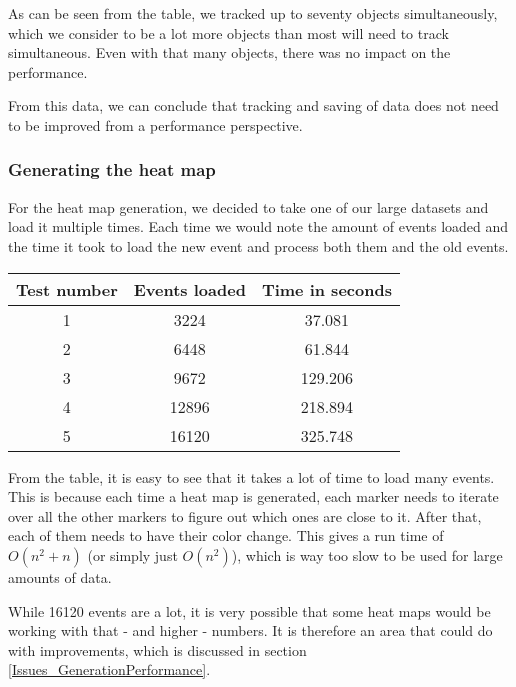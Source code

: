 As can be seen from the table, we tracked up to seventy objects simultaneously, which we consider to be a lot more objects than most will need to track simultaneous. Even with that many objects, there was no impact on the performance.

From this data, we can conclude that tracking and saving of data does not need to be improved from a performance perspective.

\subsubsection{Generating the heat map}
\label{Testing_Performance_Generating}

For the heat map generation, we decided to take one of our large datasets and load it multiple times. Each time we would note the amount of events loaded and the time it took to load the new event and process both them and the old events.

\begin{center}
	\begin{tabular}{| c | c | c |}
		\hline
		Test number & Events loaded & Time in seconds \\ \hline
		1 & 3224 & 37.081 \\ \hline
		2 & 6448 & 61.844 \\ \hline
		3 & 9672 & 129.206 \\ \hline
		4 & 12896 & 218.894 \\ \hline
		5 & 16120 & 325.748 \\
		\hline
	\end{tabular}
\end{center}

From the table, it is easy to see that it takes a lot of time to load many events. This is because each time a heat map is generated, each marker needs to iterate over all the other markers to figure out which ones are close to it. After that, each of them needs to have their color change. This gives a run time of $O(n^2 + n)$ (or simply just $O(n^2)$), which is way too slow to be used for large amounts of data.

While 16120 events are a lot, it is very possible that some heat maps would be working with that - and higher - numbers. It is therefore an area that could do with improvements, which is discussed in section \ref{Issues_GenerationPerformance}.